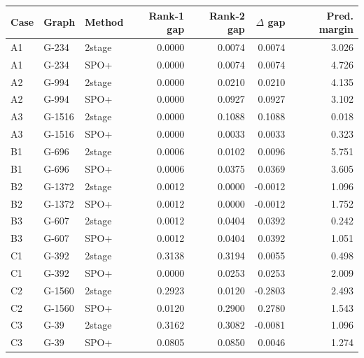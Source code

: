 \begin{tabular}{lllrrrr}
\toprule
Case & Graph & Method & Rank-1 gap & Rank-2 gap & $\Delta$ gap & Pred. margin \\
\midrule
A1 & G-234 & 2stage & 0.0000 & 0.0074 & 0.0074 & 3.026 \\
A1 & G-234 & SPO+ & 0.0000 & 0.0074 & 0.0074 & 4.726 \\
A2 & G-994 & 2stage & 0.0000 & 0.0210 & 0.0210 & 4.135 \\
A2 & G-994 & SPO+ & 0.0000 & 0.0927 & 0.0927 & 3.102 \\
A3 & G-1516 & 2stage & 0.0000 & 0.1088 & 0.1088 & 0.018 \\
A3 & G-1516 & SPO+ & 0.0000 & 0.0033 & 0.0033 & 0.323 \\
B1 & G-696 & 2stage & 0.0006 & 0.0102 & 0.0096 & 5.751 \\
B1 & G-696 & SPO+ & 0.0006 & 0.0375 & 0.0369 & 3.605 \\
B2 & G-1372 & 2stage & 0.0012 & 0.0000 & -0.0012 & 1.096 \\
B2 & G-1372 & SPO+ & 0.0012 & 0.0000 & -0.0012 & 1.752 \\
B3 & G-607 & 2stage & 0.0012 & 0.0404 & 0.0392 & 0.242 \\
B3 & G-607 & SPO+ & 0.0012 & 0.0404 & 0.0392 & 1.051 \\
C1 & G-392 & 2stage & 0.3138 & 0.3194 & 0.0055 & 0.498 \\
C1 & G-392 & SPO+ & 0.0000 & 0.0253 & 0.0253 & 2.009 \\
C2 & G-1560 & 2stage & 0.2923 & 0.0120 & -0.2803 & 2.493 \\
C2 & G-1560 & SPO+ & 0.0120 & 0.2900 & 0.2780 & 1.543 \\
C3 & G-39 & 2stage & 0.3162 & 0.3082 & -0.0081 & 1.096 \\
C3 & G-39 & SPO+ & 0.0805 & 0.0850 & 0.0046 & 1.274 \\
\bottomrule
\end{tabular}
